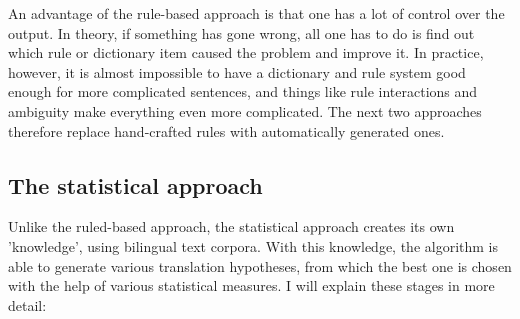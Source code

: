 \documentclass[12pt]{article}
\begin{document}
An advantage of the rule-based approach is that one has a lot of control over the output. In theory, if something has gone wrong, all one has to do is find out which rule or dictionary item caused the problem and improve it. In practice, however, it is almost impossible to have a dictionary and rule system good enough for more complicated sentences, and things like rule interactions and ambiguity make everything even more complicated. The next two approaches therefore replace hand-crafted rules with automatically generated ones.


\subsection{The statistical approach}

Unlike the ruled-based approach, the statistical approach creates its own 'knowledge', using bilingual text corpora. With this knowledge, the algorithm is able to generate various translation hypotheses, from which the best one is chosen with the help of various statistical measures. I will explain these stages in more detail:
\end{document}
